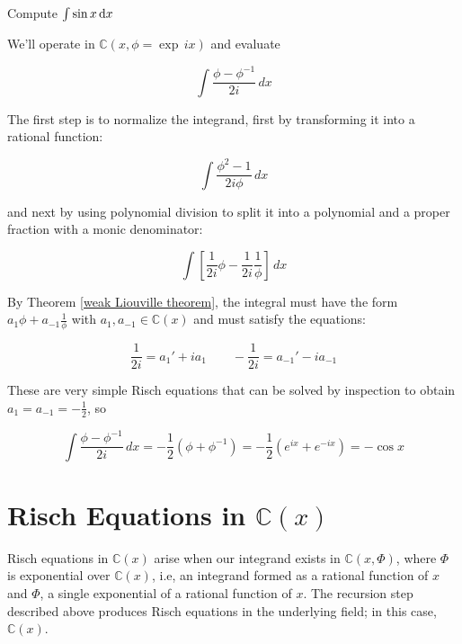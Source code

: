 \begin{comment}
$$F' = \sum_{i=-l}^n (c_i' + i c_i k' )\theta^i
  + \sum_{i=1}^\nu \sum_{j=1}^{m_i} \frac{b_{ij}'(\theta) n_i(\theta) - j b_{ij}(\theta) n_i'(\theta) }{n_i(\theta)^{j+1}}
  + \sum_{i=1}^\eta d_i \frac{n_i(\theta)'}{n_i(\theta)}$$
\end{comment}

\endtheorem

\vfil\eject

\example Compute $\int \sin x \, {\rm d}x$

We'll operate in ${\mathbb C}(x, \phi = \exp \,ix)$ and evaluate

$$\int \frac{\phi - \phi^{-1}}{2i} \,dx$$

The first step is to normalize the integrand, first by transforming it
into a rational function:

$$\int \frac{\phi^2 - 1}{2i \phi} \,dx $$

and next by using polynomial division to split it into a polynomial
and a proper fraction with a monic denominator:

$$\int \left[ \frac{1}{2i} \phi - \frac{1}{2i} \frac{1}{\phi} \right] \,dx $$

By Theorem \ref{weak Liouville theorem}, the integral must have the
form $a_1 \phi + a_{-1} \frac{1}{\phi}$ with $a_1, a_{-1} \in {\mathbb
C}(x)$ and must satisfy the equations:

$$\frac{1}{2i} = a_1' + i a_1 \qquad - \frac{1}{2i} = a_{-1}' - i a_{-1}$$ 

These are very simple Risch equations that can be solved by inspection
to obtain $a_1 = a_{-1} = -\frac{1}{2}$, so

$$\int \frac{\phi - \phi^{-1}}{2i} \,dx = -\frac{1}{2}(\phi + \phi^{-1})
 = -\frac{1}{2}(e^{ix} + e^{-ix}) = -\cos x$$

\endexample

\vfill\eject
\section{Risch Equations in ${\mathbb C}(x)$}

Risch equations in ${\mathbb C}(x)$ arise when our integrand exists in
${\mathbb C}(x,\Phi)$, where $\Phi$ is exponential over ${\mathbb
C}(x)$, i.e, an integrand formed as a rational function of $x$ and $\Phi$, a
single exponential of a rational function of $x$.  The recursion step
described above produces Risch equations in the underlying field;
in this case, ${\mathbb C}(x)$.

